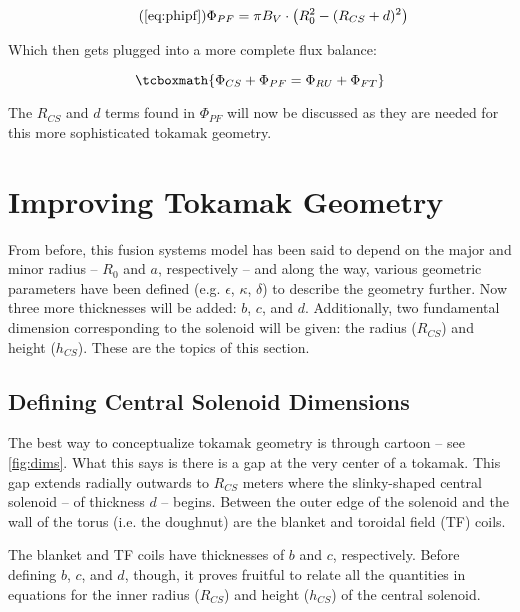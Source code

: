 \begin{equation}
	\tag{\ref{eq:phipf}}
	\Phi_{PF} = \pi B_V \cdot \left( R_0^2 - ( R_{CS} + d ) ^ 2 \right)
\end{equation}

Which then gets plugged into a more complete flux balance:

\begin{equation}
	\label{eq:full_ibal}
	\tcboxmath{
		\Phi_{CS} + \Phi_{PF} = \Phi_{RU} + \Phi_{FT}
	}
\end{equation}

The $R_{CS}$ and $d$ terms found in $\Phi_{PF}$ will now be discussed as they are needed for this more sophisticated tokamak geometry.

\section{Improving Tokamak Geometry}

From before, this fusion systems model has been said to depend on the major and minor radius -- $R_0$ and $a$, respectively -- and along the way, various geometric parameters have been defined (e.g. $\epsilon$, $\kappa$, $\delta$) to describe the geometry further. Now three more thicknesses will be added: $b$, $c$, and $d$. Additionally, two fundamental dimension corresponding to the solenoid will be given: the radius ($R_{CS}$) and height ($h_{CS}$). These are the topics of this section.

\subsection{Defining Central Solenoid Dimensions}

The best way to conceptualize tokamak geometry is through cartoon -- see \cref{fig:dims}. What this says is there is a gap at the very center of a tokamak. This gap extends radially outwards to $R_{CS}$ meters where the slinky-shaped central solenoid -- of thickness $d$ -- begins. Between the outer edge of the solenoid and the wall of the torus (i.e. the doughnut) are the blanket and toroidal field (TF) coils.

\begin{figure*}
\centering

\caption{Dimensions of Tokamak Cross-Section}
\label{fig:dims}
\end{figure*}

The blanket and TF coils have thicknesses of $b$ and $c$, respectively. Before defining $b$, $c$, and $d$, though, it proves fruitful to relate all the quantities in equations for the inner radius ($R_{CS}$) and height ($h_{CS}$) of the central solenoid.
 
